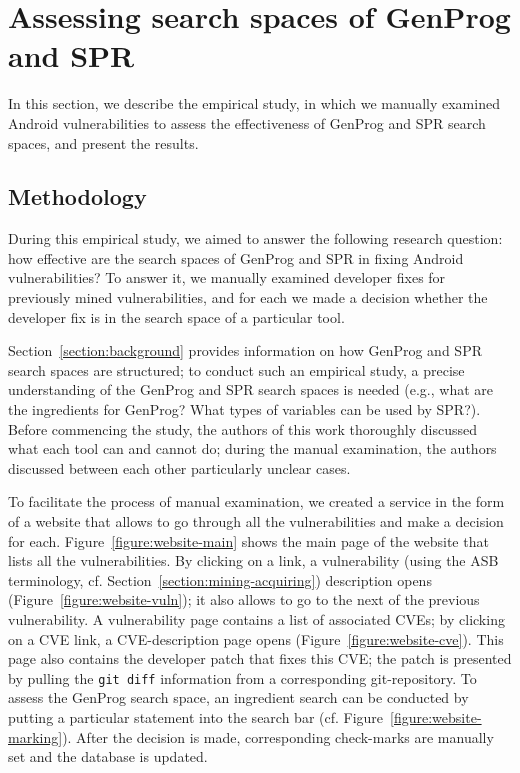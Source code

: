 \section{Assessing search spaces of GenProg and SPR}
\label{section:assessing}

In this section, we describe the empirical study, in which we manually examined \numvuln Android vulnerabilities to assess the effectiveness of GenProg and SPR search spaces, and present the results.

\subsection{Methodology}

During this empirical study, we aimed to answer the following research question: how effective are the search spaces of GenProg and SPR in fixing Android vulnerabilities?
To answer it, we manually examined developer fixes for \numvuln previously mined vulnerabilities, and for each we made a decision whether the developer fix is in the search space of a particular tool.

Section~\ref{section:background} provides information on how GenProg and SPR search spaces are structured; to conduct such an empirical study, a precise understanding of the GenProg and SPR search spaces is needed (e.g., what are the ingredients for GenProg? What types of variables can be used by SPR?). Before commencing the study, the authors of this work thoroughly discussed what each tool can and cannot do; during the manual examination, the authors discussed between each other particularly unclear cases.

To facilitate the process of manual examination, we created a service in the form of a website that allows to go through all the vulnerabilities and make a decision for each.
Figure~\ref{figure:website-main} shows the main page of the website that lists all the vulnerabilities.
By clicking on a link, a vulnerability (using the ASB terminology, cf. Section~\ref{section:mining-acquiring}) description opens (Figure~\ref{figure:website-vuln}); it also allows to go to the next of the previous vulnerability.
A vulnerability page contains a list of associated CVEs; by clicking on a CVE link, a CVE-description page opens (Figure~\ref{figure:website-cve}).
This page also contains the developer patch that fixes this CVE; the patch is presented by pulling the \texttt{git diff} information from a corresponding git-repository.
To assess the GenProg search space, an ingredient search can be conducted by putting a particular statement into the search bar (cf. Figure~\ref{figure:website-marking}).
After the decision is made, corresponding check-marks are manually set and the database is updated.

